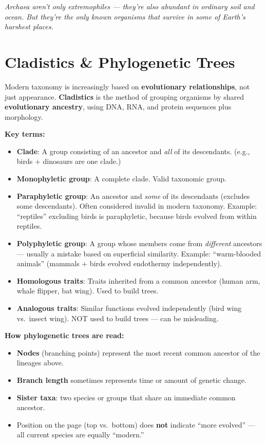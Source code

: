 \documentclass[11pt, letterpaper]{article}
\begin{document}
\textit{Archaea aren't \emph{only} extremophiles --- they're also abundant in ordinary soil
and ocean. But they're the only known organisms that survive in some of Earth's harshest places.}

\section*{Cladistics \& Phylogenetic Trees}

Modern taxonomy is increasingly based on \textbf{evolutionary relationships}, not just
appearance. \textbf{Cladistics} is the method of grouping organisms by shared
\textbf{evolutionary ancestry}, using DNA, RNA, and protein sequences plus morphology.

\textbf{Key terms:}
\begin{itemize}[noitemsep]
  \item \textbf{Clade}: A group consisting of an ancestor and \emph{all} of its descendants. (e.g., birds + dinosaurs are one clade.)
  \item \textbf{Monophyletic group}: A complete clade. Valid taxonomic group.
  \item \textbf{Paraphyletic group}: An ancestor and \emph{some} of its descendants (excludes some descendants). Often considered invalid in modern taxonomy. Example: ``reptiles'' excluding birds is paraphyletic, because birds evolved from within reptiles.
  \item \textbf{Polyphyletic group}: A group whose members come from \emph{different} ancestors --- usually a mistake based on superficial similarity. Example: ``warm-blooded animals'' (mammals + birds evolved endothermy independently).
  \item \textbf{Homologous traits}: Traits inherited from a common ancestor (human arm, whale flipper, bat wing). Used to build trees.
  \item \textbf{Analogous traits}: Similar functions evolved independently (bird wing vs.\ insect wing). NOT used to build trees --- can be misleading.
\end{itemize}

\textbf{How phylogenetic trees are read:}
\begin{itemize}[noitemsep]
  \item \textbf{Nodes} (branching points) represent the most recent common ancestor of the lineages above.
  \item \textbf{Branch length} sometimes represents time or amount of genetic change.
  \item \textbf{Sister taxa}: two species or groups that share an immediate common ancestor.
  \item Position on the page (top vs.\ bottom) does \textbf{not} indicate ``more evolved'' --- all current species are equally ``modern.''
\end{itemize}
\end{document}
